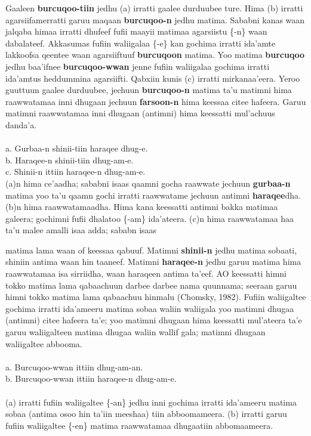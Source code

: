 \documentclass[11pt,b5paper]{book}
\begin{document}
Gaaleen \textbf{burcuqoo-tiin} jedhu (a) irratti gaalee durduubee ture. Hima (b) irratti agarsiifamerratti garuu maqaan \textbf{burcuqoo-n} jedhu matima. Sababni kanas waan jalqaba himaa irratti dhufeef fufii maayii matimaa agarsiistu \{-n\} waan dabalateef. Akkasumas fufiin waliigalaa \{-e\} kan gochima irratti ida’amte lakkoofsa qeentee waan agarsiiftuuf \textbf{burcuqoon} matima. Yoo
matima \textbf{burcuqoo} jedhu baa’ifnee \textbf{burcuqoo-wwan} jenne fufiin waliigalaa gochima irratti ida’amtus heddummina agarsiifti. Qabxiin kunis (c) irratti mirkanaa’eera. Yeroo guuttuun gaalee
durduubee, jechuun \textbf{burcuqoo-n} matima ta’u matimni hima raawwatamaa inni dhugaan jechuun \textbf{farsoon-n} hima keessaa citee hafeera. Garuu matimni raawwatamaa inni dhugaan (antimni) hima keessatti mul’achuus danda’a. \\
\\
a. Gurbaa-n shinii-tiin haraqee dhug-e.\\
b. Haraqee-n shinii-tiin dhug-am-e.\\
c. Shinii-n ittiin haraqee-n dhug-am-e.\\

(a)n hima ce’aadha; sababni isaas qaamni gocha raawwate jechuun \textbf{gurbaa-n} matima yoo ta’u qaamn gochi irratti raawwatame jechuun antimni \textbf{haraqee}dha. (b)n hima raawwatamaadha. Hima kana keessatti antimni bakka matimaa galeera; gochimni fufii dhalatoo \{-am\} ida’ateera. (c)n hima
raawwatamaa haa ta’u malee amalli isaa adda; sababn isaas 

matima lama waan of keessaa qabuuf. Matimni \textbf{shinii-n} jedhu matima sobaati, shiniin antima waan hin taaneef. Matimni \textbf{haraqee-n} jedhu garuu matima hima raawwatamaa isa sirriidha, waan haraqeen antima ta’eef. AO keessatti himni tokko matima lama qabaachuun darbee darbee nama
quunnama; seeraan garuu himni tokko matima lama qabaachuu hinmalu (Chomsky, 1982). Fufiin waliigaltee gochima irratti ida’ameeru matima sobaa waliin waliigala yoo matimni dhugaa (antimni) citee hafeera ta’e; yoo matimni dhugaan hima keessatti mul’ateera ta’e garuu waliigalteen matima dhugaa waliin wallif gala; matimni dhugaan waliigaltee abbooma. \\
\\
a. Burcuqoo-wwan ittiin dhug-am-an.\\
b. Burcuqoo-wwan ittiin haraqee-n dhug-am-e.\\
\\
(a) irratti fufiin waliigaltee \{-an\} jedhu inni gochima irratti ida’ameeru matima sobaa (antima osoo hin ta’iin meeshaa) tiin abboomameera. (b) irratti garuu fufiin waliigaltee \{-en\} matima
raawwatamaa dhugaatiin abbomaameera. 
\end{document}
